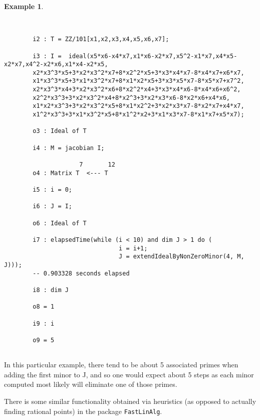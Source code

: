 \documentclass[11pt]{amsart}
\theoremstyle{definition}
\newtheorem{example}{Example}[section]
\begin{document}
\begin{example}~~
	
	~~
	{{\small\color{blue}
	\begin{verbatim}
		i2 : T = ZZ/101[x1,x2,x3,x4,x5,x6,x7];
		
		i3 : I =  ideal(x5*x6-x4*x7,x1*x6-x2*x7,x5^2-x1*x7,x4*x5-x2*x7,x4^2-x2*x6,x1*x4-x2*x5,
		x2*x3^3*x5+3*x2*x3^2*x7+8*x2^2*x5+3*x3*x4*x7-8*x4*x7+x6*x7,
		x1*x3^3*x5+3*x1*x3^2*x7+8*x1*x2*x5+3*x3*x5*x7-8*x5*x7+x7^2,
		x2*x3^3*x4+3*x2*x3^2*x6+8*x2^2*x4+3*x3*x4*x6-8*x4*x6+x6^2,
		x2^2*x3^3+3*x2*x3^2*x4+8*x2^3+3*x2*x3*x6-8*x2*x6+x4*x6,
		x1*x2*x3^3+3*x2*x3^2*x5+8*x1*x2^2+3*x2*x3*x7-8*x2*x7+x4*x7,
		x1^2*x3^3+3*x1*x3^2*x5+8*x1^2*x2+3*x1*x3*x7-8*x1*x7+x5*x7);
		
		o3 : Ideal of T
		
		i4 : M = jacobian I;
		
		             7       12
		o4 : Matrix T  <--- T
		
		i5 : i = 0;
		
		i6 : J = I;
		
		o6 : Ideal of T
		
		i7 : elapsedTime(while (i < 10) and dim J > 1 do (
                                i = i+1; 
                                J = extendIdealByNonZeroMinor(4, M, J)));
		-- 0.903328 seconds elapsed
		
		i8 : dim J
		
		o8 = 1
		
		i9 : i
		
		o9 = 5
		
	\end{verbatim}
}}
	
	\end{example} 

In this particular example, there tend to be about 5 associated primes when adding the first minor to J, and so one would expect about 5 steps as each minor computed most likely will eliminate one of those primes.

There is some similar functionality obtained via heuristics (as opposed to actually finding rational points) in the package {\tt FastLinAlg}.


\vspace{2em}
\end{document}
